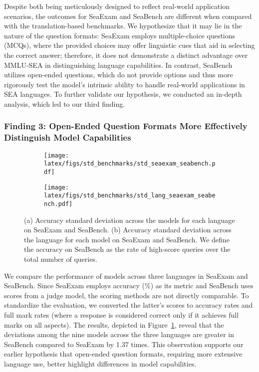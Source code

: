 Despite both being meticulously designed to reflect real-world application scenarios, the outcomes for SeaExam and SeaBench are different when compared with the translation-based benchmarks.
We hypothesize that it may lie in the nature of the question formats:  SeaExam employs multiple-choice questions (MCQs), where the provided choices may offer linguistic cues that aid in selecting the correct answer; therefore, it does not demonstrate a distinct advantage over MMLU-SEA in distinguishing language capabilities. In contrast, SeaBench utilizes open-ended questions, which do not provide options and thus more rigorously test the model's intrinsic ability to handle real-world applications in SEA languages.
To further validate our hypothesis, we conducted an in-depth analysis, which led to our third finding.

\subsubsection{Finding 3: Open-Ended Question Formats More Effectively Distinguish Model Capabilities} \label{finding3}

\begin{figure}[htb]
    \centering
    \begin{subfigure}[b]{0.48\linewidth}
        \centering
        \texttt{[image: latex/figs/std\_benchmarks/std\_seaexam\_seabench.pdf]}
        \caption{}
    \end{subfigure}
    \begin{subfigure}[b]{0.48\linewidth}
        \centering
        \texttt{[image: latex/figs/std\_benchmarks/std\_lang\_seaexam\_seabench.pdf]}
        \caption{}
    \end{subfigure}
    \caption{(a) Accuracy standard deviation across the models for each language on SeaExam and SeaBench. (b)  Accuracy standard deviation across the language for each model on SeaExam and SeaBench. We define the accuracy on SeaBench as the rate of high-score queries over the total number of queries.}
    \label{fig:find3}
\end{figure}


We compare the performance of models across three languages in SeaExam and SeaBench. Since SeaExam employs accuracy (\%) as its metric and SeaBench uses scores from a judge model, the scoring methods are not directly comparable. To standardize the evaluation, we converted the latter’s scores to accuracy rates and full mark rates (where a response is considered correct only if it achieves full marks on all aspects). The results, depicted in Figure~\ref{fig:find3}, reveal that the deviations among the nine models across the three languages are greater in SeaBench compared to SeaExam by 1.37 times. This observation supports our earlier hypothesis that open-ended question formats, requiring more extensive language use, better highlight differences in model capabilities. 


